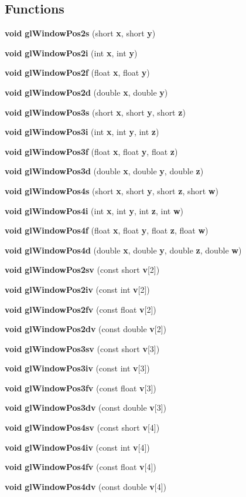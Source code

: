 \subsection*{Functions}
\begin{DoxyCompactItemize}
\item 
{\bf void} {\bf gl\+Window\+Pos2s} (short {\bf x}, short {\bf y})
\item 
{\bf void} {\bf gl\+Window\+Pos2i} (int {\bf x}, int {\bf y})
\item 
{\bf void} {\bf gl\+Window\+Pos2f} (float {\bf x}, float {\bf y})
\item 
{\bf void} {\bf gl\+Window\+Pos2d} (double {\bf x}, double {\bf y})
\item 
{\bf void} {\bf gl\+Window\+Pos3s} (short {\bf x}, short {\bf y}, short {\bf z})
\item 
{\bf void} {\bf gl\+Window\+Pos3i} (int {\bf x}, int {\bf y}, int {\bf z})
\item 
{\bf void} {\bf gl\+Window\+Pos3f} (float {\bf x}, float {\bf y}, float {\bf z})
\item 
{\bf void} {\bf gl\+Window\+Pos3d} (double {\bf x}, double {\bf y}, double {\bf z})
\item 
{\bf void} {\bf gl\+Window\+Pos4s} (short {\bf x}, short {\bf y}, short {\bf z}, short {\bf w})
\item 
{\bf void} {\bf gl\+Window\+Pos4i} (int {\bf x}, int {\bf y}, int {\bf z}, int {\bf w})
\item 
{\bf void} {\bf gl\+Window\+Pos4f} (float {\bf x}, float {\bf y}, float {\bf z}, float {\bf w})
\item 
{\bf void} {\bf gl\+Window\+Pos4d} (double {\bf x}, double {\bf y}, double {\bf z}, double {\bf w})
\item 
{\bf void} {\bf gl\+Window\+Pos2sv} (const short {\bf v}[2])
\item 
{\bf void} {\bf gl\+Window\+Pos2iv} (const int {\bf v}[2])
\item 
{\bf void} {\bf gl\+Window\+Pos2fv} (const float {\bf v}[2])
\item 
{\bf void} {\bf gl\+Window\+Pos2dv} (const double {\bf v}[2])
\item 
{\bf void} {\bf gl\+Window\+Pos3sv} (const short {\bf v}[3])
\item 
{\bf void} {\bf gl\+Window\+Pos3iv} (const int {\bf v}[3])
\item 
{\bf void} {\bf gl\+Window\+Pos3fv} (const float {\bf v}[3])
\item 
{\bf void} {\bf gl\+Window\+Pos3dv} (const double {\bf v}[3])
\item 
{\bf void} {\bf gl\+Window\+Pos4sv} (const short {\bf v}[4])
\item 
{\bf void} {\bf gl\+Window\+Pos4iv} (const int {\bf v}[4])
\item 
{\bf void} {\bf gl\+Window\+Pos4fv} (const float {\bf v}[4])
\item 
{\bf void} {\bf gl\+Window\+Pos4dv} (const double {\bf v}[4])
\end{DoxyCompactItemize}


